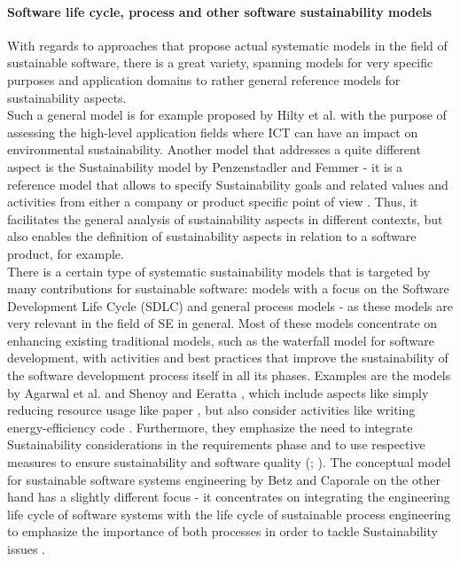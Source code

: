 \documentclass[oribibl]{llncs}
\begin{document}
\paragraph{Software life cycle, process and other software sustainability models}
With regards to approaches that propose actual systematic %
models in the field of sustainable software, there is a great variety, spanning models for very specific purposes and application domains %
to rather general reference models for sustainability aspects.\\
Such a general model is for example proposed by Hilty et al. \cite{hilty_relevance_2006} with the purpose of assessing the high-level application fields where ICT can have an impact on environmental sustainability. Another model that addresses a quite different aspect is the Sustainability model by Penzenstadler and Femmer \cite{penzenstadler_generic_2013} - it is a reference model that allows to specify Sustainability goals and related values and activities from either a company or product specific point of view \cite{penzenstadler_generic_2013}. Thus, it facilitates the general analysis of sustainability aspects in different contexts, but also enables the definition of sustainability aspects in relation to a software product, for example.\\
There is a certain type of systematic sustainability models that is targeted by many contributions for sustainable software: models with a focus on the Software Development Life Cycle (SDLC) %
and general process models - as these models are very relevant in the field of SE in general. Most of these models concentrate on enhancing existing traditional models, such as the waterfall model %
for software development, with activities and best practices that improve the sustainability of the software development process itself in all its phases. Examples are the models by Agarwal et al. \cite{agarwal_sustainable_2012} and Shenoy and Eeratta \cite{shenoy_green_2011}, which include aspects like simply reducing resource usage like paper \cite{shenoy_green_2011}, but also consider activities like writing energy-efficiency code \cite{agarwal_sustainable_2012}. Furthermore, they emphasize the need to integrate Sustainability considerations in the requirements phase and to use respective measures to ensure sustainability and software quality (\cite{agarwal_sustainable_2012}; \cite{shenoy_green_2011}). The conceptual model for sustainable software systems engineering by Betz and Caporale \cite{betz_sustainable_2014} on the other hand has a slightly different focus - it concentrates on integrating the engineering life cycle of software systems with the life cycle of sustainable process engineering to emphasize the importance of both processes in order to tackle Sustainability issues \cite{betz_sustainable_2014}.
\end{document}
